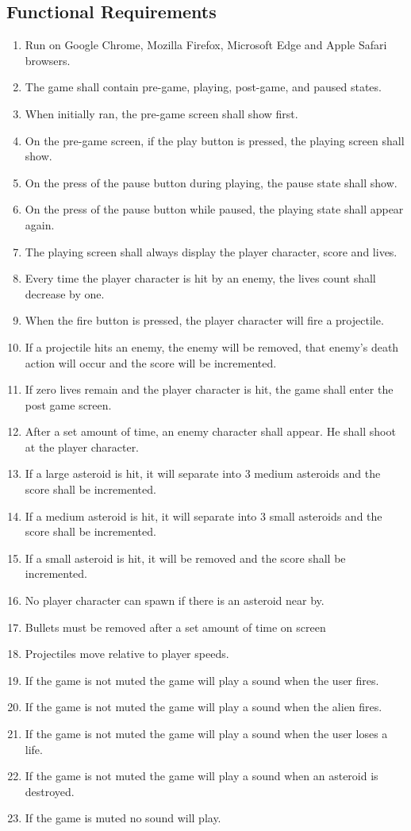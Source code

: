 \documentclass[12pt, titlepage]{article}
\begin{document}
\subsection{Functional Requirements}
\begin{enumerate}
  \item Run on Google Chrome, Mozilla Firefox, Microsoft Edge and Apple Safari browsers.
  \item The game shall contain pre-game, playing, post-game, and paused states.
  \item When initially ran, the pre-game screen shall show first.
  \item On the pre-game screen, if the play button is pressed, the playing screen shall show.
  \item On the press of the pause button during playing, the pause state shall show.
  \item On the press of the pause button while paused, the playing state shall appear again.
  \item The playing screen shall always display the player character, score and lives.
  \item Every time the player character is hit by an enemy, the lives count shall decrease by one.
  \item When the fire button is pressed, the player character will fire a projectile.
  \item If a projectile hits an enemy, the enemy will be removed, that enemy's death action will occur and the score will be incremented.
  \item If zero lives remain and the player character is hit, the game shall enter the post game screen.
  \item After a set amount of time, an enemy character shall appear. He shall shoot at the player character.
  \item If a large asteroid is hit, it will separate into 3 medium asteroids and the score shall be incremented.
  \item If a medium asteroid is hit, it will separate into 3 small asteroids and the score shall be incremented.
  \item If a small asteroid is hit, it will be removed and the score shall be incremented.
  \item No player character can spawn if there is an asteroid near by.
  \item Bullets must be removed after a set amount of time on screen
  \item Projectiles move relative to player speeds.
  \item If the game is not muted the game will play a sound when the user fires.
  \item If the game is not muted the game will play a sound when the alien fires.
  \item If the game is not muted the game will play a sound when the user loses a life.
  \item If the game is not muted the game will play a sound when an asteroid is destroyed.
  \item If the game is muted no sound will play.
\end{enumerate}
\end{document}
